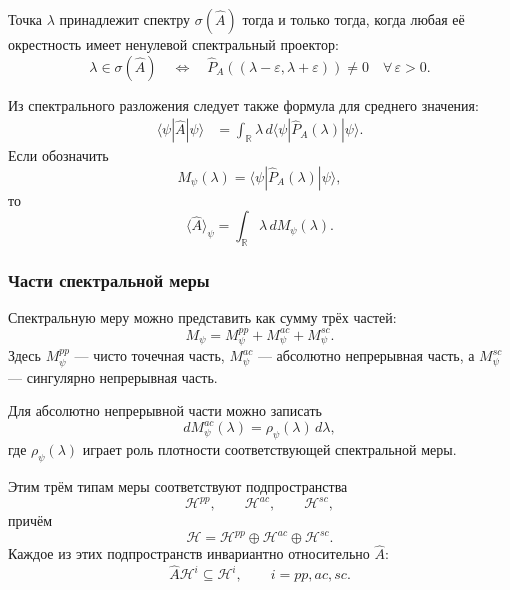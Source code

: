 \documentclass[12pt,a4paper]{article}
\begin{document}
Точка $\lambda$ принадлежит спектру $\sigma(\hat A)$ тогда и только
тогда, когда любая её окрестность имеет ненулевой спектральный
проектор:
\[
    \boxed{
        \lambda\in\sigma(\hat A)
        \quad\Longleftrightarrow\quad
        \hat P_A((\lambda-\varepsilon,\lambda+\varepsilon))
        \neq0
        \quad
        \forall\,\varepsilon>0
    }.
\]

Из спектрального разложения следует также формула для среднего
значения:
\[
\begin{aligned}
    \langle\psi|\hat A|\psi\rangle
    &=
    \int_{\mathbb R}
        \lambda\,
        d\langle\psi|
            \hat P_A(\lambda)
        |\psi\rangle.
\end{aligned}
\]
Если обозначить
\[
    \boxed{
        M_\psi(\lambda)
        =
        \langle\psi|
            \hat P_A(\lambda)
        |\psi\rangle
    },
\]
то
\[
    \boxed{
        \langle\hat A\rangle_\psi
        =
        \int_{\mathbb R}
            \lambda\,dM_\psi(\lambda)
    }.
\]


\subsubsection{Части спектральной меры}

Спектральную меру можно представить как сумму трёх частей:
\[
    \boxed{
        M_\psi
        =
        M_\psi^{pp}
        +
        M_\psi^{ac}
        +
        M_\psi^{sc}
    }.
\]
Здесь $M_\psi^{pp}$ --- чисто точечная часть,
$M_\psi^{ac}$ --- абсолютно непрерывная часть, а
$M_\psi^{sc}$ --- сингулярно непрерывная часть.

Для абсолютно непрерывной части можно записать
\[
    dM_\psi^{ac}(\lambda)
    =
    \rho_\psi(\lambda)\,d\lambda,
\]
где $\rho_\psi(\lambda)$ играет роль плотности соответствующей
спектральной меры.

Этим трём типам меры соответствуют подпространства
\[
    \mathcal H^{pp},
    \qquad
    \mathcal H^{ac},
    \qquad
    \mathcal H^{sc},
\]
причём
\[
    \boxed{
        \mathcal H
        =
        \mathcal H^{pp}
        \oplus
        \mathcal H^{ac}
        \oplus
        \mathcal H^{sc}
    }.
\]
Каждое из этих подпространств инвариантно относительно $\hat A$:
\[
    \boxed{
        \hat A\mathcal H^i
        \subseteq
        \mathcal H^i,
        \qquad
        i=pp,ac,sc
    }.
\]


\end{document}
